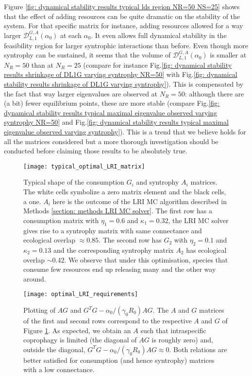 \documentclass[12pt, titlepage]{report}
\begin{document}
Figure \ref{fig: dynamical stability results typical lds region NR=50 NS=25} shows that the effect of adding resources can be quite dramatic on the stability of the system. For that specific matrix for instance, adding resources allowed for a way larger $\mathcal{D}^{G,A}_{L,1}\left(\alpha_0\right)$ at each $\alpha_0$. It even allows full dynamical stability in the feasibility region for larger syntrophic interactions than before.
Even though more syntrophy can be sustained, it seems that the volume of $\mathcal{D}_{L,1}^{G,A}(\alpha_0)$ is smaller at $N_R=50$ than at $N_R=25$ (compare for  instance Fig.\ref{fig: dynamical stability results shrinkage of DL1G varying syntrophy NR=50} with Fig.\ref{fig: dynamical stability results shrinkage of DL1G varying syntrophy}). This is compensated by the fact that way larger eigenvalues are observed at $N_R=50$: although there are (a bit) fewer equilibrium points, these are more stable (compare Fig.\ref{fig: dynamical stability results typical maximal eigenvalue observed varying syntrophy NR=50} and Fig.\ref{fig: dynamical stability results typical maximal eigenvalue observed varying syntrophy}). This is a trend that we believe holds for all the matrices considered but a more thorough investigation should be conducted before claiming those results to be absolutely true.
\begin{figure}
\texttt{[image: typical\_optimal\_LRI\_matrix]}
\caption{Typical shape of the consumption $G_i$ and syntrophy $A_i$ matrices. The white cells symbolize a zero matrix element and the black cells, a one. $A_i$ here is the outcome of the LRI MC algorithm described in Methods \ref{section: methods LRI MC solver}. The first row has a consumption matrix with $\eta_1=0.6$ and $\kappa_1=0.32$, the LRI MC solver gives rise to a syntrophy matrix with same connectance and ecological overlap $\approx 0.85$. The second row has $G_2$ with $\eta_2=0.1$ and $\kappa_2=0.13$ and the corresponding syntrophy matrix $A_2$ has ecological overlap $\sim 0.42$. We observe that under this optimisation, species that consume few resources end up releasing many and the other way around.}\label{fig: dynamical stability results typical shape of consumption syntrophy LRI algorithm}
\end{figure}
\begin{figure}
  \begin{minipage}[c]{0.67\textwidth}
    \texttt{[image: optimal\_LRI\_requirements]}
  \end{minipage}\hfill
  \begin{minipage}[c]{0.3\textwidth}
    \caption{Plotting of $AG$ and $G^TG-\alpha_0/(\gamma_0R_0) AG$. The $A$ and $G$ matrices of the first and second rows correspond to the respective $A$ and $G$ of Figure \ref{fig: dynamical stability results typical shape of consumption syntrophy LRI algorithm}. As expected, we obtain an $A$ such that intraspecific coprophagy is limited (the diagonal of $AG$ is roughly zero) and, outside the diagonal, $G^TG-\alpha_0/(\gamma_0R_0) AG \approx 0$. Both relations are better satisfied for consumption (and hence syntrophy) matrices with a low connectance.}\label{fig: dynamical stability optimal LRI requirements met}
  \end{minipage}
\end{figure}
\end{document}
